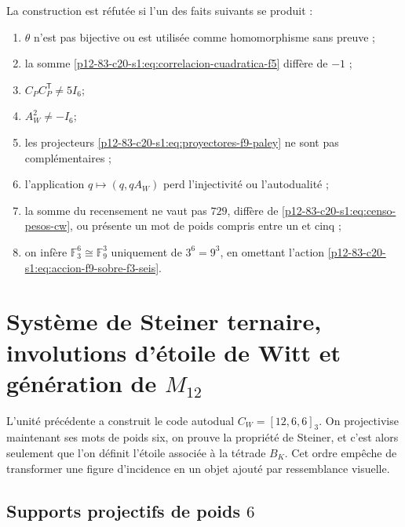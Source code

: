 \begin{criterion}
La construction est réfutée si l'un des faits
suivants se produit :
\begin{enumerate}
 \item \(\theta\) n'est pas bijective ou est utilisée comme homomorphisme sans preuve ;
 \item la somme \eqref{p12-83-c20-s1:eq:correlacion-cuadratica-f5} diffère de \(-1\) ;
 \item \(C_PC_P^{\mathsf T}\neq5I_6\);
 \item \(A_W^2\neq-I_6\);
 \item les projecteurs \eqref{p12-83-c20-s1:eq:proyectores-f9-paley} ne sont pas
       complémentaires ;
 \item l'application \(q\mapsto(q,qA_W)\) perd l'injectivité ou
       l'autodualité ;
 \item la somme du recensement ne vaut pas \(729\), diffère de
       \eqref{p12-83-c20-s1:eq:censo-pesos-cw}, ou présente un mot de poids compris entre un
       et cinq ;
 \item on infère \(\mathbb F_3^6\cong\mathbb F_9^3\) uniquement de
       \(3^6=9^3\), en omettant l'action \eqref{p12-83-c20-s1:eq:accion-f9-sobre-f3-seis}.
\end{enumerate}
\end{criterion}



\section{Système de Steiner ternaire, involutions d'étoile de Witt et génération de \texorpdfstring{\(M_{12}\)}{M12}}
\label{p12-83-c20-s2:chap:sistema-witt-estrellas-m12}

L'unité précédente a construit le code autodual
\(C_W=[12,6,6]_3\). On projectivise maintenant ses mots de poids six,
on prouve la propriété de Steiner, et c'est alors seulement que l'on définit l'étoile
associée à la tétrade \(B_K\). Cet ordre empêche de transformer une figure
d'incidence en un objet ajouté par ressemblance visuelle.

\subsection{Supports projectifs de poids \(6\)}

